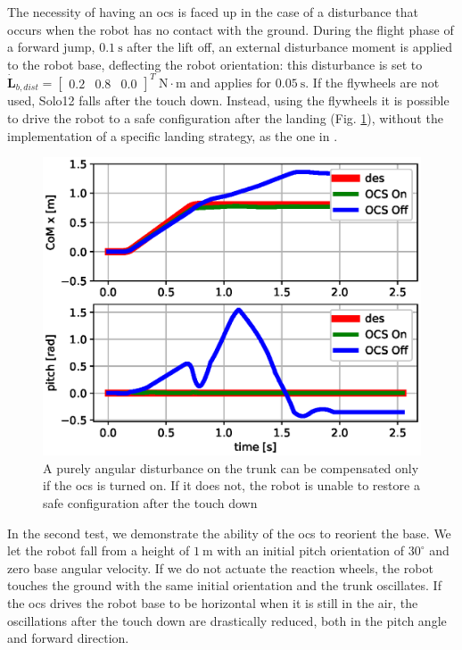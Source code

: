 \documentclass[letterpaper, 10 pt, conference]{ieeeconf}  %
\begin{document}
The necessity of having an \gls{ocs} is faced up in the case of a disturbance that occurs when the robot has no contact with the ground. 
During the flight phase of a forward jump, $0.1~\mathrm{s}$ after the lift off, an external disturbance moment is applied to the robot base, deflecting the robot orientation: this disturbance is set to $\dot{\bm{L}}_{b, dist} = \left[\begin{array}{ccc}
0.2 & 0.8 & 0.0
\end{array}
\right]^T \ \mathrm{N \cdot m}$ and applies for $0.05 \ \mathrm{s}$. 
If the flywheels are not used, Solo12 falls after the touch down. Instead, 
using the flywheels %
it is possible to drive the robot to a safe configuration after the landing (Fig. \ref{fig:fw_jump}), without the implementation of a specific landing strategy, as the one in \cite{jeon2021real}.
\begin{figure}
	\centering
	\includegraphics[width=1\linewidth]{figures/fw_jump.eps}
	\caption{\small A purely angular disturbance on the trunk can be compensated only if the \gls{ocs} is turned on. If it does not, the robot is unable to restore a safe configuration after the touch down}
	\label{fig:fw_jump}
\end{figure}

In the second test, we demonstrate the ability of the \gls{ocs} to reorient the base.
We let the robot fall from a height of $1 \ \mathrm{m}$ with an initial pitch orientation of $30^\circ$ and zero base angular velocity.
If we do not actuate the reaction wheels, the robot touches the ground with the same initial orientation and the trunk oscillates. If the \gls{ocs} drives the robot base to be horizontal when it is still in the air, the oscillations after the touch down are drastically reduced, both in the pitch angle and forward direction. 
\end{document}
